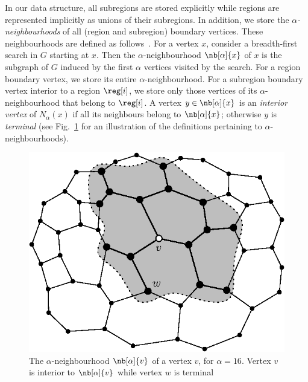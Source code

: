 In our data structure, all subregions are stored explicitly while
regions are represented implicitly as unions of their subregions.
In addition, we store the \emph{$\alpha$-neighbourhoods} of all (region
and subregion) boundary vertices.
These neighbourhoods are defined
as follows~\cite{DBLP:conf/soda/AgarwalAMVV98}.
For a vertex $x$, consider a breadth-first search in $G$ starting at $x$.
Then the $\alpha$-neighbourhood $\nb[\alpha]{x}$ of $x$ is the subgraph of $G$
induced by the first $\alpha$ vertices visited by the search.
For a region boundary vertex, we store its entire $\alpha$-neighbourhood.
For a subregion boundary vertex interior to a region $\reg[i]$, we store
only those vertices of its $\alpha$-neighbourhood that belong to
$\reg[i]$.
A vertex $y \in \nb[\alpha]{x}$ is an \emph{interior vertex} of
$N_\alpha(x)$ if all its neighbours belong to $\nb[\alpha]{x}$;
otherwise $y$ is \emph{terminal}
(see Fig.~\ref{fig:alpha_neighbourhoods} for an illustration of the
definitions pertaining to $\alpha$-neighbourhoods).

\begin{figure}[t]
  \centering
  \includegraphics{Fig2}
  \caption[$\alpha$-neighbourhood of a boundary vertex]{The 
	$\alpha$-neighbourhood $\nb[\alpha]{v}$ of a vertex $v$,
    for $\alpha = 16$.
    Vertex $v$ is interior to $\nb[\alpha]{v}$ while vertex $w$ is terminal}
  \label{fig:alpha_neighbourhoods}
\end{figure}

